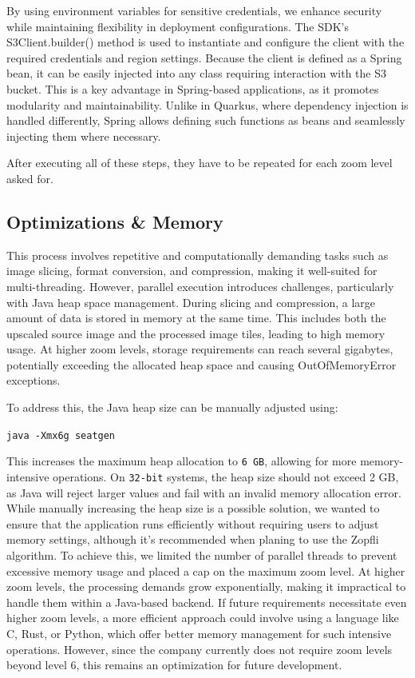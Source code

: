 By using environment variables for sensitive credentials, we enhance security while maintaining flexibility in deployment configurations.
The SDK’s S3Client.builder() method is used to instantiate and configure the client with the required credentials and region settings. Because the client is defined as a Spring bean, it can be easily injected into any class requiring interaction with the S3 bucket. This is a key advantage in Spring-based applications, as it promotes modularity and maintainability. Unlike in Quarkus, where dependency injection is handled differently, Spring allows defining such functions as beans and seamlessly injecting them where necessary.

After executing all of these steps, they have to be repeated for each zoom level asked for. 

\subsection{Optimizations \& Memory}

This process involves repetitive and computationally demanding tasks such as image slicing, format conversion, and compression, making it well-suited for multi-threading. However, parallel execution introduces challenges, particularly with Java heap space management. During slicing and compression, a large amount of data is stored in memory at the same time. This includes both the upscaled source image and the processed image tiles, leading to high memory usage. At higher zoom levels, storage requirements can reach several gigabytes, potentially exceeding the allocated heap space and causing OutOfMemoryError exceptions.

To address this, the Java heap size can be manually adjusted using:

\texttt{java -Xmx6g seatgen}

This increases the maximum heap allocation to \texttt{6 GB}, allowing for more memory-intensive operations. On \texttt{32-bit} systems, the heap size should not exceed 2 GB, as Java will reject larger values and fail with an invalid memory allocation error.
While manually increasing the heap size is a possible solution, we wanted to ensure that the application runs efficiently without requiring users to adjust memory settings, although it's recommended when planing to use the Zopfli algorithm. To achieve this, we limited the number of parallel threads to prevent excessive memory usage and placed a cap on the maximum zoom level. At higher zoom levels, the processing demands grow exponentially, making it impractical to handle them within a Java-based backend. If future requirements necessitate even higher zoom levels, a more efficient approach could involve using a language like C, Rust, or Python, which offer better memory management for such intensive operations. However, since the company currently does not require zoom levels beyond level 6, this remains an optimization for future development.

